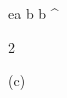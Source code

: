 \begin{eqcode}{e}{a }{}{}
  b \in {} \lend
  b \gets \genar \limits ^ {  \begin{tmatrix}
  2  \lend
  \end{tmatrix} }(c)  \lend %
\end{eqcode}
